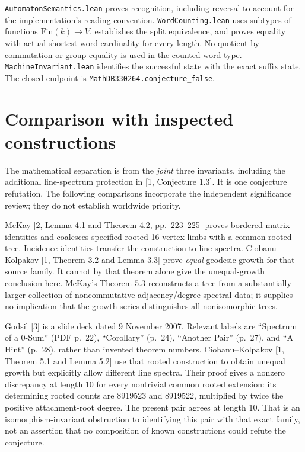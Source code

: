 \documentclass[11pt]{article}
\begin{document}
\texttt{AutomatonSemantics.lean} proves recognition, including reversal to account for the implementation's reading convention. \texttt{WordCounting.lean} uses subtypes of functions \(\mathrm{Fin}(k)\to V\), establishes the split equivalence, and proves equality with actual shortest-word cardinality for every length. No quotient by commutation or group equality is used in the counted word type. \texttt{MachineInvariant.lean} identifies the successful state with the exact suffix state. The closed endpoint is \texttt{MathDB330264.conjecture\_false}.
\newpage
\section{Comparison with inspected constructions}
The mathematical separation is from the \emph{joint} three invariants, including the additional line-spectrum protection in [1, Conjecture 1.3]. It is one conjecture refutation. The following comparisons incorporate the independent significance review; they do not establish worldwide priority.

McKay [2, Lemma 4.1 and Theorem 4.2, pp.~223--225] proves bordered matrix identities and coalesces specified rooted 16-vertex limbs with a common rooted tree. Incidence identities transfer the construction to line spectra. Ciobanu--Kolpakov [1, Theorem 3.2 and Lemma 3.3] prove \emph{equal} geodesic growth for that source family. It cannot by that theorem alone give the unequal-growth conclusion here. McKay's Theorem 5.3 reconstructs a tree from a substantially larger collection of noncommutative adjacency/degree spectral data; it supplies no implication that the growth series distinguishes all nonisomorphic trees.

Godsil [3] is a slide deck dated 9 November 2007. Relevant labels are ``Spectrum of a 0-Sum'' (PDF p.~22), ``Corollary'' (p.~24), ``Another Pair'' (p.~27), and ``A Hint'' (p.~28), rather than invented theorem numbers. Ciobanu--Kolpakov [1, Theorem 5.1 and Lemma 5.2] use that rooted construction to obtain unequal growth but explicitly allow different line spectra. Their proof gives a nonzero discrepancy at length 10 for every nontrivial common rooted extension: its determining rooted counts are 8919523 and 8919522, multiplied by twice the positive attachment-root degree. The present pair agrees at length 10. That is an isomorphism-invariant obstruction to identifying this pair with that exact family, not an assertion that no composition of known constructions could refute the conjecture.
\end{document}
